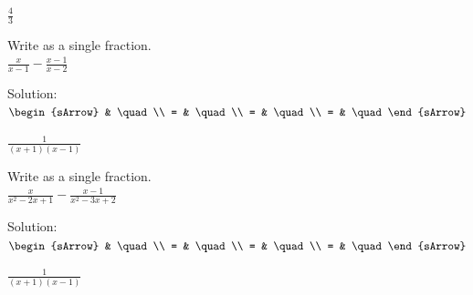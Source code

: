 \begin{mtask}[resume]
\begin{exercise}
\begin{envSolution}
                 \begin{shortsolution}  
				       $\frac{4}{3}$
			     \end{shortsolution}				 
               \end{envSolution}
         \end{exercise}
    \task \begin{exercise} Write as a single fraction.\\
	                       $ \frac{x}{x-1}-\frac{x-1}{x-2}    $
             \begin{envSolution}
			      Solution:\\[0.5cm]
                     \-\hspace{1.5cm} $\begin{sArrow}
                              &     \quad                  \\
     						= &     \quad         \\
                            = &   \quad \\
                            = &   \quad                    
						  \end{sArrow}$			   
                 \begin{shortsolution}  
				       $ \frac{1}{(x+1)(x-1)}  $
			     \end{shortsolution}				 
               \end{envSolution}
         \end{exercise}
    \task \begin{exercise} Write as a single fraction.\\
	                       $ \frac{x}{x^2-2x+1}-\frac{x-1}{x^2-3x+2}    $
             \begin{envSolution}
			      Solution:\\[0.5cm]
                     \-\hspace{1.5cm} $\begin{sArrow}
                              &     \quad                  \\
     						= &     \quad         \\
                            = &   \quad \\
                            = &   \quad                    
						  \end{sArrow}$			   
                 \begin{shortsolution}  
				       $ \frac{1}{(x+1)(x-1)}  $
			     \end{shortsolution}				 
               \end{envSolution}
         \end{exercise}

\end{mtask}



